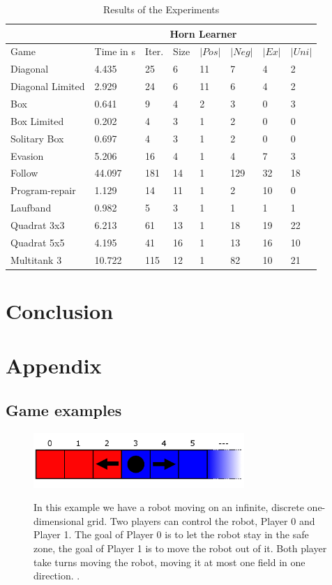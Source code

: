 \documentclass[10pt,a4paper]{article}
\theoremstyle{plain}
\theoremstyle{definition}
\begin{document}
\begin{table}[h]
 \caption{Results of the Experiments}
\begin{tabularx}{\textwidth}{p{}p{} p{} p{}p{} p{} p{} p{}}
\hline
& \multicolumn{7}{c}{Horn Learner}\\ \hline
Game & Time in s & Iter.& Size & $|Pos|$ & $|Neg|$ & $|Ex|$ & $|Uni|$ \\ \hline
Diagonal & 4.435 & 25 & 6 & 11 & 7 & 4 & 2 \\ 
Diagonal Limited & 2.929 & 24 & 6 & 11 & 6 & 4 & 2 \\ 
Box & 0.641 & 9 & 4 & 2 & 3 & 0 & 3 \\
Box Limited & 0.202 & 4 & 3 & 1 & 2 & 0 & 0 \\
Solitary Box & 0.697 & 4 & 3 & 1 & 2 & 0 & 0 \\
Evasion & 5.206 & 16 & 4 & 1 & 4 & 7 & 3 \\ 
Follow & 44.097 & 181 & 14 & 1 & 129 & 32 & 18 \\ 
Program-repair & 1.129 & 14 & 11 & 1 & 2 & 10 & 0 \\
Laufband & 0.982 & 5 & 3 & 1 & 1 & 1 & 1 \\ 
Quadrat 3x3 & 6.213 & 61 & 13 & 1 & 18 & 19 & 22 \\
Quadrat 5x5 & 4.195 & 41 & 16 & 1 & 13 & 16 & 10 \\
Multitank 3 & 10.722 & 115& 12 & 1 & 82 & 10 & 21 \\

\end{tabularx}
 \label{tab:TESTS} 
\end{table}

\newpage
\section{Conclusion}
\newpage
\section{Appendix}
\subsection{Game examples}
\begin{figure}[h] \label{Laufband}
  \caption{In this example we have a robot moving on an infinite, discrete one-dimensional grid. Two players can control the robot, Player 0 and Player 1. The goal of Player 0 is to let the robot stay in the safe zone, the goal of Player 1 is to move the robot out of it. Both player take turns moving the robot, moving it at most one field in one direction.
.}
  \centering
    {\includegraphics[width=8.0cm]{laufband.png}} 

\end{figure}
\end{document}
